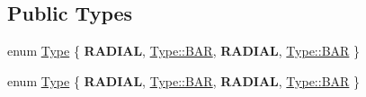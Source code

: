 \subsection*{Public Types}
\begin{DoxyCompactItemize}
\item 
enum \hyperlink{classProgressTimer_a9638d092b86d51bce727621b1a70d32f}{Type} \{ {\bfseries R\+A\+D\+I\+AL}, 
\hyperlink{classProgressTimer_a9638d092b86d51bce727621b1a70d32fa3d75eec709b70a350e143492192a1736}{Type\+::\+B\+AR}, 
{\bfseries R\+A\+D\+I\+AL}, 
\hyperlink{classProgressTimer_a9638d092b86d51bce727621b1a70d32fa3d75eec709b70a350e143492192a1736}{Type\+::\+B\+AR}
 \}
\item 
enum \hyperlink{classProgressTimer_a9638d092b86d51bce727621b1a70d32f}{Type} \{ {\bfseries R\+A\+D\+I\+AL}, 
\hyperlink{classProgressTimer_a9638d092b86d51bce727621b1a70d32fa3d75eec709b70a350e143492192a1736}{Type\+::\+B\+AR}, 
{\bfseries R\+A\+D\+I\+AL}, 
\hyperlink{classProgressTimer_a9638d092b86d51bce727621b1a70d32fa3d75eec709b70a350e143492192a1736}{Type\+::\+B\+AR}
 \}
\end{DoxyCompactItemize}
